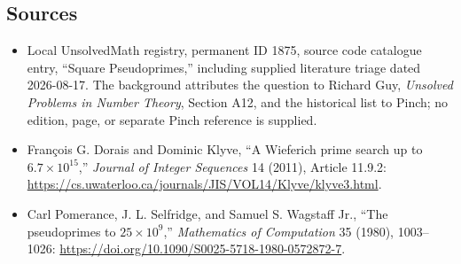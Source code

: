 \documentclass[11pt]{article}
\begin{document}
\subsection{Sources}
\begin{itemize}
\item Local UnsolvedMath registry, permanent ID 1875, source code catalogue entry, ``Square Pseudoprimes,'' including supplied literature triage dated 2026-08-17. The background attributes the question to Richard Guy, \emph{Unsolved Problems in Number Theory}, Section A12, and the historical list to Pinch; no edition, page, or separate Pinch reference is supplied.
\item Fran\c{c}ois G. Dorais and Dominic Klyve, ``A Wieferich prime search up to \(6.7\times10^{15}\),'' \emph{Journal of Integer Sequences} 14 (2011), Article 11.9.2: \url{https://cs.uwaterloo.ca/journals/JIS/VOL14/Klyve/klyve3.html}.
\item Carl Pomerance, J. L. Selfridge, and Samuel S. Wagstaff Jr., ``The pseudoprimes to \(25\times10^9\),'' \emph{Mathematics of Computation} 35 (1980), 1003--1026: \url{https://doi.org/10.1090/S0025-5718-1980-0572872-7}.
\end{itemize}
\end{document}
